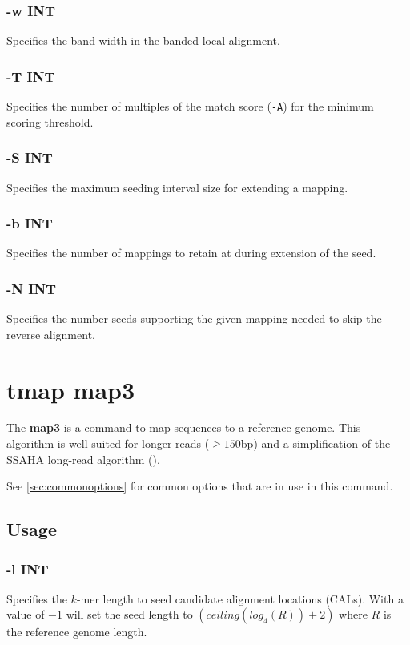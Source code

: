 \documentclass[a4paper,12pt]{book}
\newcommand{\TT}[1]{{\tt #1}} %
\newcommand{\BF}[1]{{\bf #1}} %
\begin{document}
\subsubsection{-w INT}
Specifies the band width in the banded local alignment.

\subsubsection{-T INT}
Specifies the number of multiples of the match score (\TT{-A}) for the minimum scoring threshold.

\subsubsection{-S INT}
Specifies the maximum seeding interval size for extending a mapping.

\subsubsection{-b INT}
Specifies the number of mappings to retain at during extension of the seed.

\subsubsection{-N INT}
Specifies the number seeds supporting the given mapping needed to skip the reverse alignment.

\section{tmap map3}
\label{sec:map3}
The \BF{map3} is a command to map sequences to a reference genome.
This algorithm is well suited for longer reads ($\geq 150$bp) and a simplification of the SSAHA long-read algorithm (\cite{SSAHA}).

See \autoref{sec:commonoptions} for common options that are in use in this command.

\subsection{Usage}

\subsubsection{-l INT}
Specifies the $k$-mer length to seed candidate alignment locations (CALs).
With a value of $-1$ will set the seed length to $\left(ceiling(log_4(R)) + 2\right)$ where $R$ is the reference genome length.
\end{document}
